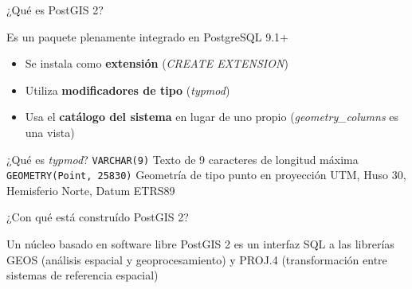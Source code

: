 \documentclass{classes/beamer_GeomaticaUA}
\begin{document}
\begin{frame}{¿Qué es PostGIS 2?}
\begin{block}{Es un paquete plenamente integrado en PostgreSQL 9.1+}
\begin{itemize}
\item Se instala como \textbf{extensión} (\textit{CREATE EXTENSION})
\item Utiliza \textbf{modificadores de tipo} (\textit{typmod})
\item Usa el \textbf{catálogo del sistema} en lugar de uno propio (\textit{geometry\_columns} es una vista)
\end{itemize}
\end{block}
\begin{exampleblock}{¿Qué es \textit{typmod}?}
\lstinline!VARCHAR(9)! Texto de 9 caracteres de longitud máxima
\lstinline!GEOMETRY(Point, 25830)! Geometría de tipo punto en proyección UTM, Huso 30, Hemisferio Norte, Datum ETRS89
\end{exampleblock}
\end{frame}

\begin{frame}{¿Con qué está construído PostGIS 2?}
\begin{block}{Un núcleo basado en software libre}
PostGIS 2 es un interfaz SQL a las librerías GEOS (análisis espacial y geoprocesamiento) y PROJ.4 (transformación entre sistemas de referencia espacial)
\end{block}

\end{frame}
\end{document}
